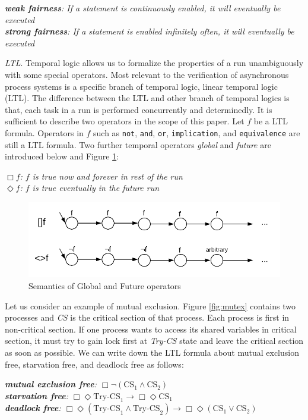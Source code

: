{\medbreak\indent\textit{\textbf{weak fairness}: If a statement is continuously enabled, it will eventually be executed}}
{\\\indent\textit{\textbf{strong fairness}: If a statement is enabled infinitely often, it will eventually be executed}}
\medbreak

\textit{LTL}. Temporal logic allows us to formalize the properties of a run unambiguously with some special operators. Most relevant to the verification of asynchronous process systems is a specific branch of temporal logic, linear temporal logic (LTL). The difference between the LTL and other branch of temporal logics is that, each task in a run is performed concurrently and determinedly. It is sufficient to describe two operators in the scope of this paper. Let $f$ be a LTL formula. Operators in $f$ such as \texttt{not}, \texttt{and}, \texttt{or}, \texttt{implication}, and \texttt{equivalence} are still a LTL formula. Two further temporal operators \textit{global} and \textit{future} are introduced below and Figure \ref{fig:ltl}:

{\medbreak\indent\textit{$\Box f$: $f$ is true now and forever in rest of the run}}
{\\\indent\textit{$\Diamond f$: $f$ is true eventually in the future run}}
\medbreak

\begin{figure}
\includegraphics[width=0.9\linewidth]{img/ltl}
\caption{Semantics of Global and Future operators}
\label{fig:ltl}
\end{figure}

Let us consider an example of mutual exclusion. Figure \ref{fig:mutex} contains two processes and \textit{CS} is the critical section of that process. Each process is first in non-critical section. If one process wants to access its shared variables in critical section, it must try to gain lock first at \textit{Try-CS} state and leave the critical section as soon as possible. We can write down the LTL formula about mutual exclusion free, starvation free, and deadlock free as follows:

{\medbreak\indent\textit{\textbf{mutual exclusion free}: $\Box\neg(\text{CS}_1\wedge\text{CS}_2)$}}
{\\\indent\textit{\textbf{starvation free}: $\Box\Diamond \text{Try-CS}_1\rightarrow\Box\Diamond\text{CS}_1$}}
{\\\indent\textit{\textbf{deadlock free}: $\Box\Diamond(\text{Try-CS}_1\wedge\text{Try-CS}_2)\rightarrow\Box\Diamond(\text{CS}_1\vee\text{CS}_2)$}}
\medbreak


